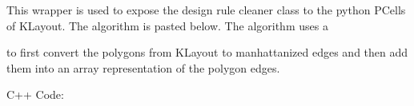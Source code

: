 \documentclass[a4paper,10pt,english]{sphinxmanual}
\begin{document}
\begin{fulllineitems}
\begin{fulllineitems}
\begin{quote}
\begin{description}
\end{description}\end{quote}

\end{fulllineitems}


\end{fulllineitems}


This wrapper is used to expose the design rule cleaner class to the python PCells of KLayout.
The algorithm is pasted below. The algorithm uses a %
\begin{footnote}[11]\sphinxAtStartFootnote
{}
%
\end{footnote}
to first convert the polygons from KLayout to manhattanized edges and then add them into an array representation
of the polygon edges.

C++ Code:
\end{document}
